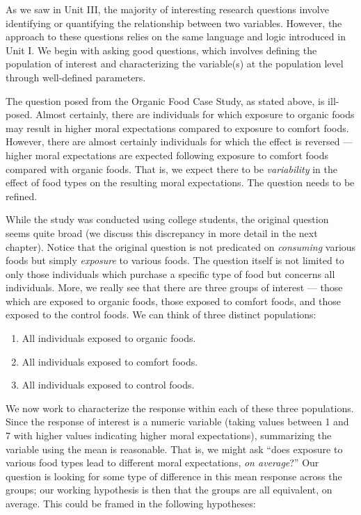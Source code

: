 \documentclass[
  letterpaper,
  DIV=11,
  numbers=noendperiod]{scrreprt}
\providecommand{\tightlist}{%
  \setlength{\itemsep}{0pt}\setlength{\parskip}{0pt}}\usepackage{longtable,booktabs,array}
\theoremstyle{definition}
\theoremstyle{definition}
\theoremstyle{plain}
\theoremstyle{remark}
\begin{document}
As we saw in Unit III, the majority of interesting research questions
involve identifying or quantifying the relationship between two
variables. However, the approach to these questions relies on the same
language and logic introduced in Unit I. We begin with asking good
questions, which involves defining the population of interest and
characterizing the variable(s) at the population level through
well-defined parameters.

The question posed from the Organic Food Case Study, as stated above, is
ill-posed. Almost certainly, there are individuals for which exposure to
organic foods may result in higher moral expectations compared to
exposure to comfort foods. However, there are almost certainly
individuals for which the effect is reversed --- higher moral
expectations are expected following exposure to comfort foods compared
with organic foods. That is, we expect there to be \emph{variability} in
the effect of food types on the resulting moral expectations. The
question needs to be refined.

While the study was conducted using college students, the original
question seems quite broad (we discuss this discrepancy in more detail
in the next chapter). Notice that the original question is not
predicated on \emph{consuming} various foods but simply \emph{exposure}
to various foods. The question itself is not limited to only those
individuals which purchase a specific type of food but concerns all
individuals. More, we really see that there are three groups of interest
--- those which are exposed to organic foods, those exposed to comfort
foods, and those exposed to the control foods. We can think of three
distinct populations:

\begin{enumerate}
\def\labelenumi{\arabic{enumi}.}
\tightlist
\item
  All individuals exposed to organic foods.
\item
  All individuals exposed to comfort foods.
\item
  All individuals exposed to control foods.
\end{enumerate}

We now work to characterize the response within each of these three
populations. Since the response of interest is a numeric variable
(taking values between 1 and 7 with higher values indicating higher
moral expectations), summarizing the variable using the mean is
reasonable. That is, we might ask ``does exposure to various food types
lead to different moral expectations, \emph{on average}?'' Our question
is looking for some type of difference in this mean response across the
groups; our working hypothesis is then that the groups are all
equivalent, on average. This could be framed in the following
hypotheses:
\end{document}
